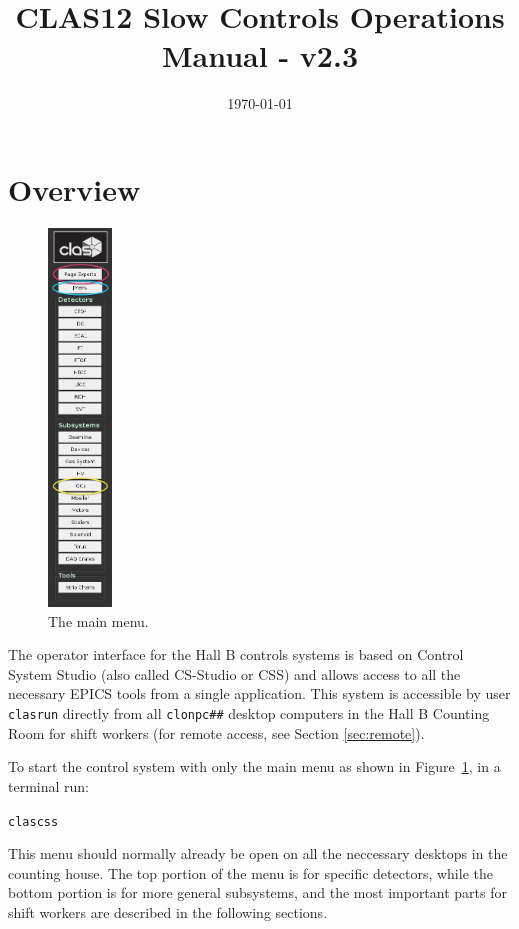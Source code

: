 \documentclass[amsmath,amssymb,notitlepage,11pt]{revtex4}
\begin{document}
\title{CLAS12 Slow Controls Operations Manual - v2.3}
\date{\today}
\begin{abstract}
\end{abstract}

\maketitle
\tableofcontents
\newpage

\section{Overview}

\begin{figure}\centering\vspace{1cm}
  \includegraphics[width=0.15\textwidth]{pics/mainmenu}
  \caption{The main menu.\label{fig:mainmenu}}
\end{figure}

The operator interface for the Hall B controls systems is based on Control System Studio (also called CS-Studio or CSS) and allows access to all the necessary EPICS tools from a single application.  This system is accessible by user \texttt{clasrun} directly from all \texttt{clonpc\#\#} desktop computers in the Hall B Counting Room for shift workers (for remote access, see Section \ref{sec:remote}).


To start the control system with only the main menu as shown in Figure~\ref{fig:mainmenu}, in a terminal run: \begin{center}\texttt{clascss}\end{center}  This menu should normally already be open on all the neccessary desktops in the counting house.  The top portion of the menu is for specific detectors, while the bottom portion is for more general subsystems, and the most important parts for shift workers are described in the following sections.
\end{document}
